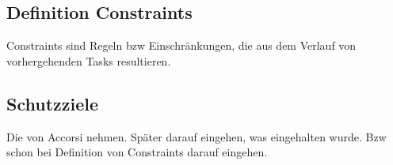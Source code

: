 \subsection{Definition Constraints}
Constraints sind Regeln bzw Einschränkungen, die aus dem Verlauf von vorhergehenden Tasks resultieren.

\subsection{Schutzziele}
Die von Accorsi nehmen. Später darauf eingehen, was eingehalten wurde. Bzw schon bei Definition von Constraints darauf eingehen.





